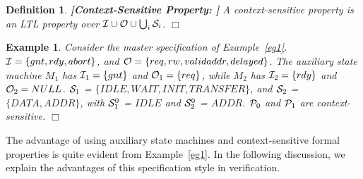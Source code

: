 \documentclass[a4paper, 11pt]{article}
\newtheorem{example}{Example} %
\newtheorem{definition}{Definition} %
\begin{document}
\begin{definition} {\bf [Context-Sensitive Property: ]} \label{def5.1}
A context-sensitive property is an LTL
property over ${\cal I} \cup {\cal O} \cup \bigcup_i {\cal S}_i$.
$\Box$
\end{definition}

\begin{example} \label{eg2}
{\em Consider the master specification of Example~\ref{eg1}.
${\cal I} = \{gnt, rdy, abort\}$,
and ${\cal O} = \{req, rw, validaddr, delayed\}$. The auxiliary state machine
$M_1$ has ${\cal I}_1 = \{gnt\}$ and ${\cal O}_1 = \{req\}$, while
$M_2$ has ${\cal I}_2 = \{rdy\}$ and ${\cal O}_2 = NULL$.
${\cal S}_1$ = $\{IDLE, WAIT, INIT, TRANSFER \}$, and
${\cal S}_2$ = $\{DATA, ADDR \}$, with ${\cal S}^0_1$ = $IDLE$ and
${\cal S}^0_2$ = $ADDR$.
${\cal P}_0$ and ${\cal P}_1$ are context-sensitive.
} $\Box$
\end{example}

\noindent
The advantage of using auxiliary state machines and context-sensitive 
formal properties is quite evident from Example~\ref{eg1}. In the 
following discussion, we explain the advantages of this specification 
style in verification.
\end{document}
